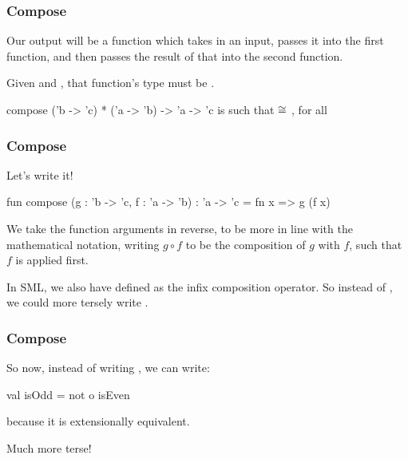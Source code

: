 \documentclass[aspectratio=169, handout]{beamer}
\begin{document}
\begin{frame}[fragile]
  \frametitle{Compose}

  Our output will be a function which takes in an input, passes it into the
  first function, and then passes the result of that into the second function.

  \pause
  \vspace{\fill}

  Given  and , that function's type must be
  .

  \spec
    {compose}
    {('b -> 'c) * ('a -> 'b) -> 'a -> 'c}
    {}
    { is such that  $\cong$ , for all }
\end{frame}

\begin{frame}[fragile]
  \frametitle{Compose}

  Let's write it!

  \pause
  \vspace{\fill}

  \begin{codeblock}
    fun compose (g : 'b -> 'c, f : 'a -> 'b) : 'a -> 'c =
      fn x => g (f x)
  \end{codeblock}

  \pause
  \vspace{\fill}

  We take the function arguments in reverse, to be more in line with the
  mathematical notation, writing $g \circ f$ to be the composition of $g$
  with $f$, such that $f$ is applied first.

  \pause
  \vspace{\fill}

  In SML, we also have  defined as the infix composition operator. So
  instead of , we could more tersely write .
\end{frame}

\begin{frame}[fragile]
  \frametitle{Compose}

  So now, instead of writing , we can write:

  \pause
  \vspace{\fill}

  \begin{codeblock}
    val isOdd = not o isEven
  \end{codeblock}
  because it is extensionally equivalent.

  \pause
  \vspace{\fill}

  Much more terse!
\end{frame}
\end{document}
